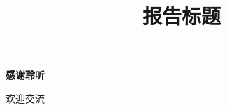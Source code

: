\documentclass[aspectratio=169]{beamer}
\title[报告标题]{报告标题}
\subtitle{}
\author{}
\institute{}
\date{}
\begin{document}
\begin{frame}
  \titlepage
\end{frame}


\begin{frame}
  \centering
  {\LARGE\bfseries 感谢聆听\par}
  \vspace{.8em}
  {\large 欢迎交流}
\end{frame}
\end{document}
